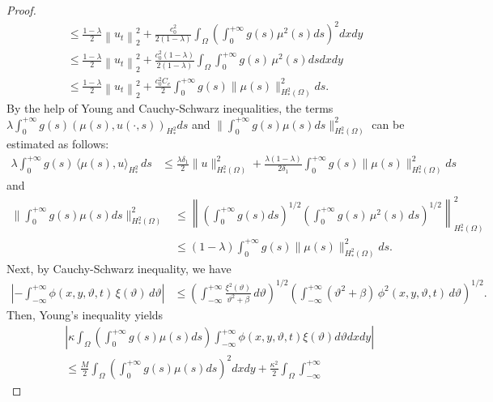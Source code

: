 \documentclass[12pt]{article}
\numberwithin{equation}{section}
\begin{document}
\begin{proof}
\begin{align}
&\le \frac{1-\lambda}{2}\left\|u_{t}\right\|_{2}^{2}
   + \frac{c_{0}^{2}}{2(1-\lambda)}
     \int_{\Omega} \left( \int_{0}^{+\infty} g(s)\mu^{2}(s)ds \right)^{2} dx dy \nonumber\\
&\le \frac{1-\lambda}{2}\left\|u_{t}\right\|_{2}^{2}
   + \frac{c_{0}^{2}(1-\lambda)}{2(1-\lambda)}
     \int_{\Omega} \int_{0}^{+\infty} g(s)\,\mu^{2}(s) ds dx dy \nonumber\\
&\le \frac{1-\lambda}{2}\left\|u_{t}\right\|_{2}^{2}
   + \frac{c_{0}^{2}C_{e}}{2}
     \int_{0}^{+\infty} g(s)\|\mu(s)\|^2_{H^2_*(\Omega)} ds.
\end{align}
By the help of Young and Cauchy-Schwarz inequalities, the terms $\lambda \displaystyle\int_{0}^{+\infty}g(s)(\mu(s), u(\cdot,s))_{H^2_*} ds$ and  $\Big\| \displaystyle\int_{0}^{+\infty} g(s) \mu(s)ds \Big\|^2_{H^2_*(\Omega)}$ can be estimated as follows:
\begin{align}\label{psi2^6}
\lambda \int_{0}^{+\infty} g(s)\,
   \langle \mu(s), u\rangle_{H_*^{2}}\,ds
&\le \frac{\lambda\delta_1}{2}\|u\|_{H_*^{2}(\Omega)}^{2}
 + \frac{\lambda(1-\lambda)}{2\delta_1}
   \int_{0}^{+\infty} g(s)\|\mu(s)\|_{H_*^{2}(\Omega)}^{2}ds
\end{align}
and
\begin{align}\label{psi2^7}
\Big\| \int_{0}^{+\infty} g(s)\mu(s) ds
\Big\|^2_{H^2_*(\Omega)}
&\le\left\|\left( \int_{0}^{+\infty} g(s) ds \right)^{1/2}\left( \int_{0}^{+\infty} g(s)\,\mu^{2}(s)\,ds \right)^{1/2}
\right\|_{H_*^{2}(\Omega)}^{2} \\
&\le (1-\lambda)\int_{0}^{+\infty} g(s)
     \|\mu(s)\|_{H_*^{2}(\Omega)}^{2}ds.
\end{align}
Next, by Cauchy-Schwarz inequality, we have
\begin{align*}
\left| -\int_{-\infty}^{+\infty}
    \phi(x,y,\vartheta,t)\,\xi(\vartheta)\,d\vartheta \right|
&\le
\left( \int_{-\infty}^{+\infty}
       \frac{\xi^2(\vartheta)}{\vartheta^2+\beta}\,d\vartheta \right)^{1/2}
\left( \int_{-\infty}^{+\infty}
       (\vartheta^2+\beta)\,\phi^2(x,y,\vartheta,t)\,d\vartheta \right)^{1/2}.
\end{align*}
Then, Young's inequality yields
\begin{eqnarray}\label{psi2^8}
&&\left| \kappa\displaystyle\int_\Omega\left( \int_{0}^{+\infty} g(s)\mu(s)ds \right)\int_{-\infty}^{+\infty}\phi(x,y,\vartheta,t)\xi(\vartheta)d\vartheta dx dy  \right|\nonumber\\
&&\le \frac{M}{2} \displaystyle\int_\Omega\left( \int_{0}^{+\infty} g(s)\mu(s)ds \right)^2dx dy+\frac{\kappa^2}{2}\displaystyle\int_\Omega\int_{-\infty}^{+\infty}

\end{eqnarray}
\end{proof}
\end{document}
